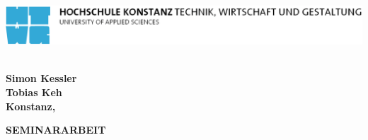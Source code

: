 \begin{titlepage}

\vspace*{-2cm}

\begin{flushleft}
\hspace*{-1cm} \includegraphics[width=15.7cm]{htwg-logo}
\end{flushleft}

\vspace{2.5cm}

\begin{center}
	\huge{
		\textbf{\sf \thema} \\[5cm]
	}
	\Large{
		\textbf{\sf Simon Kessler\\Tobias Keh}} \\[6.5cm]
	\large{
		\textbf{\sf Konstanz, \abgabedatum} \\[2.3cm]
	}
	
	\Huge{
		\textbf{{\sf SEMINARARBEIT}}
	}
\end{center}

\end{titlepage}